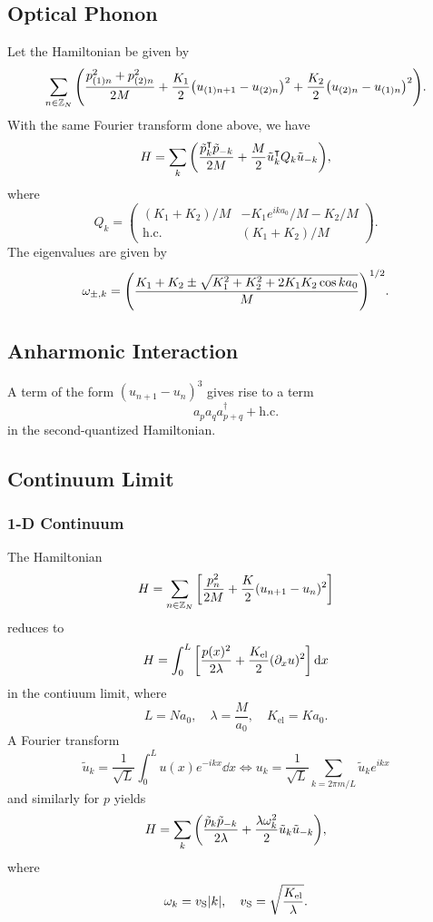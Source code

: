 \documentclass{article}
\begin{document}
\subsection{Optical Phonon}

Let the Hamiltonian be given by
\[ \sum_{n\in\mathbb{Z}_N} \qty(\frac{p_{(1)n}^2 + p_{(2)n}^2}{2M} + \frac{K_1}{2}\qty(u_{(1)n+1} - u_{(2)n})^2 + \frac{K_2}{2}\qty(u_{(2)n} - u_{(1)n})^2). \]
With the same Fourier transform done above, we have
\[ H = \sum_k \qty(\frac{\tilde{p}^\intercal_k \tilde{p}_{-k}}{2M} + \frac{M}{2} \tilde{u}^\intercal_k Q_k \tilde{u}_{-k}), \]
where
\[ Q_{k} = \begin{pmatrix}
    (K_1 + K_2)/M & -K_1 e^{ika_0}/M - K_2/M \\ \mathrm{h.c.} & (K_1 + K_2) / M
\end{pmatrix}. \]
The eigenvalues are given by
\[ \omega_{\pm,k} = \qty(\frac{K_1 + K_2 \pm \sqrt{K_1^2 + K_2^2 + 2K_1K_2 \cos k a_0}}{M})^{1/2}. \]

\subsection{Anharmonic Interaction}

A term of the form $(u_{n+1} - u_n)^3$ gives rise to a term
\[ a_{p} a_{q} a^\dagger_{p+q} + \mathrm{h.c.} \]
in the second-quantized Hamiltonian.

\subsection{Continuum Limit}

\subsubsection{1-D Continuum}

The Hamiltonian
\[ H = \sum_{n\in \mathbb{Z}_N} \qty[\frac{p_n^2}{2M} + \frac{K}{2}(u_{n+1} - u_n)^2] \]
reduces to
\[ H = \int_0^L \qty[\frac{p(x)^2}{2\lambda} + \frac{K_{\mathrm{el}}}{2}(\partial_x u)^2] \dd{x} \]
in the contiuum limit, where
\[ L = Na_0, \quad \lambda = \frac{M}{a_0},\quad K_{\mathrm{el}} = Ka_0. \]
A Fourier transform
\[ \tilde{u}_k = \frac{1}{\sqrt{L}}\int_0^L u(x) e^{-ikx}\dd{x} \Leftrightarrow u_k = \frac{1}{\sqrt{L}} \sum_{k=2\pi m/L} \tilde{u}_k e^{ikx} \]
and similarly for $p$ yields
\[ H = \sum_k \qty(\frac{\tilde{p}_k \tilde{p}_{-k}}{2\lambda} + \frac{\lambda\omega_k^2}{2}\tilde{u}_k \tilde{u}_{-k}), \]
where
\[ \omega_k = v_{\mathrm{S}}\abs{k},\quad v_{\mathrm{S}} = \sqrt{\frac{K_{\mathrm{el}}}{\lambda}}. \]
\end{document}
